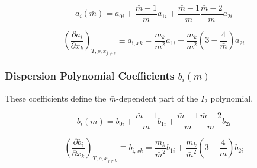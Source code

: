 \documentclass[12pt, letterpaper]{article}
\begin{document}
\begin{equation}
    a_{i}(\bar{m})=a_{0 i}+\frac{\bar{m}-1}{\bar{m}} a_{1 i}+\frac{\bar{m}-1}{\bar{m}} \frac{\bar{m}-2}{\bar{m}} a_{2 i}
    \label{eq:a_i_mbar}
\end{equation}


\begin{equation}
    \left(\frac{\partial a_{i}}{\partial x_{k}}\right)_{T,\rho,x_{j\neq k}}
    \equiv a_{\mathrm{i},xk}
    =\frac{m_{k}}{\bar{m}^{2}}a_{1i}+\frac{m_{k}}{\bar{m}^{2}}\left(3-\frac{4}{\bar{m}}\right)a_{2i}
    \label{eq:a_i_xk}
\end{equation}

\subsubsection{Dispersion Polynomial Coefficients \(b_i(\bar m)\)}

These coefficients define the \(\bar m\)-dependent part of the \(I_2\) polynomial.

\begin{equation}
    b_{i}(\bar{m})=b_{0 i}+\frac{\bar{m}-1}{\bar{m}} b_{1 i}+\frac{\bar{m}-1}{\bar{m}} \frac{\bar{m}-2}{\bar{m}} b_{2 i}
    \label{eq:b_i_mbar}
\end{equation}


\begin{equation}
    \left(\frac{\partial b_{i}}{\partial x_{k}}\right)_{T,\rho,x_{j\neq k}}
    \equiv b_{\mathrm{i},xk}
    =\frac{m_{k}}{\bar{m}^{2}}b_{1i}+\frac{m_{k}}{\bar{m}^{2}}\left(3-\frac{4}{\bar{m}}\right)b_{2i}
    \label{eq:b_i_xk}
\end{equation}
\end{document}
